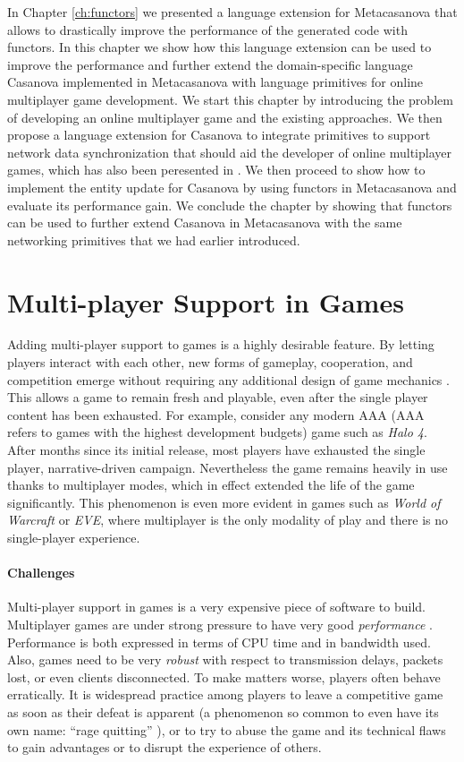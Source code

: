In Chapter \ref{ch:functors} we presented a language extension for Metacasanova that allows to drastically improve the performance of the generated code with functors. In this chapter we show how this language extension can be used to improve the performance and further extend the domain-specific language Casanova implemented in Metacasanova with language primitives for online multiplayer game development. We start this chapter by introducing the problem of developing an online multiplayer game and the existing approaches. We then propose a language extension for Casanova to integrate primitives to support network data synchronization that should aid the developer of online multiplayer games, which has also been peresented in \cite{DIGIACOMO201725}. We then proceed to show how to implement the entity update for Casanova by using functors in Metacasanova and evaluate its performance gain. We conclude the chapter by showing that functors can be used to further extend Casanova in Metacasanova with the same networking primitives that we had earlier introduced.

\section{Multi-player Support in Games}
Adding multi-player support to games is a highly desirable feature. By letting players interact with each other, new forms of gameplay, cooperation, and competition emerge without requiring any additional design of game mechanics \cite{granberg2014david}. This allows a game to remain fresh and playable, even after the single player content has been exhausted. For example, consider any modern AAA (AAA refers to games with the highest development budgets\cite{wolf2008video}) game such as \textit{Halo 4}. After months since its initial release, most players have exhausted the single player, narrative-driven campaign. Nevertheless the game remains heavily in use thanks to multiplayer modes, which in effect extended the life of the game significantly. This phenomenon is even more evident in games such as \textit{World of Warcraft} or \textit{EVE}, where multiplayer is the only modality of play and there is no single-player experience.

\paragraph{Challenges}
Multi-player support in games is a very expensive piece of software to build. Multiplayer games are under strong pressure to have very good \textit{performance} \cite{claypool2006latency}. Performance is both expressed in terms of CPU time and in bandwidth used. Also, games need to be very \textit{robust} with respect to transmission delays, packets lost, or even clients disconnected. To make matters worse, players often behave erratically. It is widespread practice among players to leave a competitive game as soon as their defeat is apparent (a phenomenon so common to even have its own name: ``rage quitting'' \cite{rage_quitting}), or to try to abuse the game and its technical flaws to gain advantages or to disrupt the experience of others.

